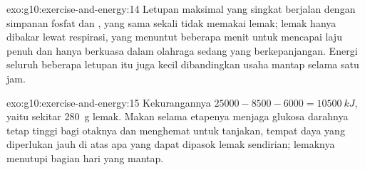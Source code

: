 \begin{solution}{exo:g10:exercise-and-energy:14}
Letupan maksimal yang singkat berjalan dengan simpanan fosfat dan
, yang sama sekali tidak memakai lemak; lemak hanya dibakar
lewat respirasi, yang menuntut beberapa menit untuk mencapai laju penuh
dan hanya berkuasa dalam olahraga sedang yang berkepanjangan. Energi
seluruh beberapa letupan itu juga kecil dibandingkan usaha mantap
selama satu jam.
\end{solution}

\begin{solution}{exo:g10:exercise-and-energy:15}
Kekurangannya $25000 - 8500 - 6000 = \qty{10500}{kJ}$, yaitu sekitar
\qty{280}{g} lemak. Makan selama etapenya menjaga glukosa darahnya
tetap tinggi bagi otaknya dan menghemat  untuk tanjakan,
tempat daya yang diperlukan jauh di atas apa yang dapat dipasok lemak
sendirian; lemaknya menutupi bagian hari yang mantap.
\end{solution}

